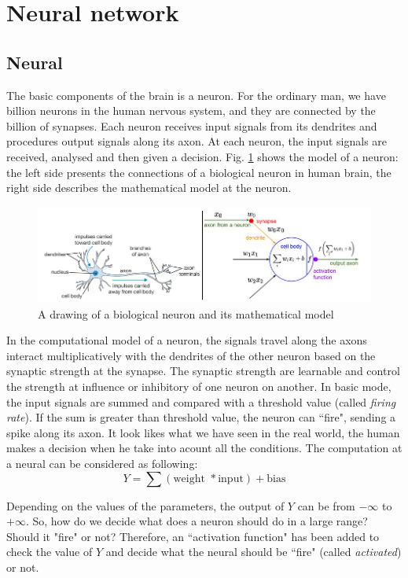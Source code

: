 \section{Neural network}
\subsection{Neural}
The basic components of the brain is a neuron. For the ordinary man, we have billion neurons in the human nervous system, and they are connected by the billion of synapses. Each neuron receives input signals from its dendrites and procedures output signals along its axon. At each neuron, the input signals are received, analysed and then given a decision. Fig. \ref{fignneuron} shows the model of a neuron: the left side presents the connections of a biological neuron in human brain, the right side describes the mathematical model at the neuron.

\begin{figure}[h]
	\centering
	\includegraphics[scale=0.5]{images/neurons.png}
	\caption{A drawing of a biological neuron and its mathematical model}
	\label{fignneuron}
\end{figure}

In the computational model of a neuron, the signals travel along the axons interact multiplicatively with the dendrites of the other neuron based on the synaptic strength at the synapse. The synaptic strength are learnable and control the strength at influence or inhibitory of one neuron on another. In basic mode, the input signals are summed and compared with a threshold value (called \textit{firing rate}). If the sum is greater than threshold value, the neuron can ``fire", sending a spike along its axon. It look likes what we have seen in the real world, the human makes a decision when he take into acount all the conditions. The computation at a neural can be considered as following:
\begin{equation}
	Y = \sum(\text{weight } \ast \text{input}) + \text{bias}
\end{equation}

Depending on the values of the parameters, the output of \textbf{$Y$} can be from $-\infty$ to $+\infty$. So, how do we decide what does a neuron should do in a large range? Should it "fire" or not? Therefore, an ``activation function" has been added to check the value of $Y$ and decide what the neural should be ``fire" (called \textit{activated}) or not.

